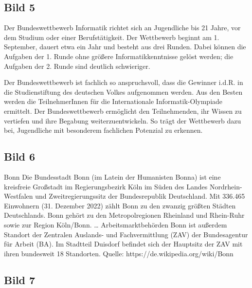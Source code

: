 \subsection{Bild 5}

\begin{flushleft}
Der Bundeswettbewerb Informatik richtet sich an Jugendliche bis 21 Jahre, vor dem Studium oder einer Berufstätigkeit. Der Wettbewerb beginnt am 1. September, dauert etwa ein Jahr und besteht aus drei Runden. Dabei können die Aufgaben der 1. Runde ohne größere Informatikkenntnisse gelöst werden; die Aufgaben der 2. Runde sind deutlich schwieriger.

Der Bundeswettbewerb ist fachlich so anspruchsvoll, dass die Gewinner i.d.R. in die Studienstiftung des deutschen Volkes aufgenommen werden. Aus den Besten werden die TeilnehmerInnen für die Internationale Informatik-Olympiade ermittelt. Der Bundeswettbewerb ermöglicht den Teilnehmenden, ihr Wissen zu vertiefen und ihre Begabung weiterzuentwickeln. So trägt der Wettbewerb dazu bei, Jugendliche mit besonderem fachlichen Potenzial zu erkennen.
\end{flushleft}

\subsection{Bild 6}

\begin{flushleft}
Bonn
\linebreak
Die Bundesstadt Bonn (im Latein der Humanisten Bonna) ist eine kreisfreie Großstadt im Regierungsbezirk Köln im Süden des Landes Nordrhein-Westfalen und Zweitregierungssitz der Bundesrepublik Deutschland. Mit 336.465 Einwohnern (31. Dezember 2022) zählt Bonn zu den zwanzig größten Städten Deutschlands. Bonn gehört zu den Metropolregionen Rheinland und Rhein-Ruhr sowie zur Region Köln/Bonn.
\linebreak
\dots
\linebreak
Arbeitsmarktbehörden Bonn ist außerdem Standort der Zentralen Auslands- und Fachvermittlung (ZAV) der Bundesagentur für Arbeit (BA). Im Stadtteil Duisdorf befindet sich der Hauptsitz der ZAV mit ihren bundesweit 18 Standorten. Quelle: https://de.wikipedia.org/wiki/Bonn
\end{flushleft}

\subsection{Bild 7}

